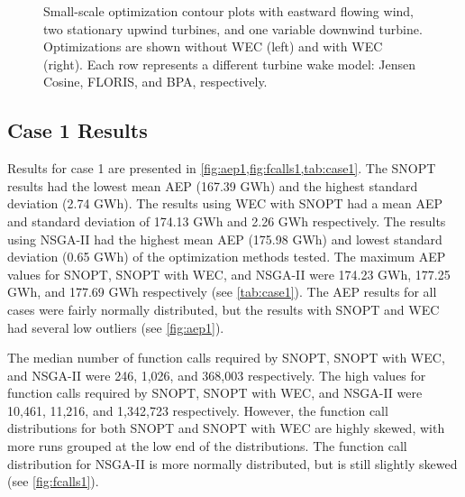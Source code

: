 \documentclass[a4paper]{jpconf}
\begin{document}
\begin{figure}[H]
{    }
    \caption{Small-scale optimization contour plots with eastward flowing wind, two stationary upwind turbines, and one variable downwind turbine. Optimizations are shown without WEC (left) and with WEC (right). Each row represents a different turbine wake model: Jensen Cosine, FLORIS, and BPA, respectively.}
    \label{fig:SmallScaleOptimizations}
\end{figure}


\subsection{Case 1 Results}
Results for case 1 are presented in \cref{fig:aep1,fig:fcalls1,tab:case1}. The SNOPT results had the lowest mean AEP (167.39 GWh) and the highest standard deviation (2.74 GWh). The results using WEC with SNOPT had a mean AEP and standard deviation of 174.13 GWh and 2.26 GWh respectively. The results using NSGA-II had the highest mean AEP (175.98 GWh) and lowest standard deviation (0.65 GWh) of the optimization methods tested. The maximum AEP values for SNOPT, SNOPT with WEC, and NSGA-II were 174.23 GWh, 177.25 GWh, and 177.69 GWh respectively (see \cref{tab:case1}). The AEP results for all cases were fairly normally distributed, but the results with SNOPT and WEC had several low outliers (see \cref{fig:aep1}).

 The median number of function calls required by SNOPT, SNOPT with WEC, and NSGA-II were 246, 1,026, and 368,003 respectively. The high values for function calls required by SNOPT, SNOPT with WEC, and NSGA-II were 10,461, 11,216, and 1,342,723 respectively. However, the function call distributions for both SNOPT and SNOPT with WEC are highly skewed, with more runs grouped at the low end of the distributions. The function call distribution for NSGA-II is more normally distributed, but is still slightly skewed (see \cref{fig:fcalls1}).
\end{document}
